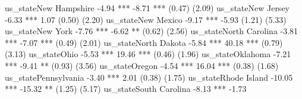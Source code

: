 us_stateNew Hampshire                                          -4.94 ***     -8.71 ***                              
                                                               (0.47)        (2.09)                                 
us_stateNew Jersey                                             -6.33 ***      1.07                                  
                                                               (0.50)        (2.20)                                 
us_stateNew Mexico                                             -9.17 ***     -5.93                                  
                                                               (1.21)        (5.33)                                 
us_stateNew York                                               -7.76 ***     -6.62 **                               
                                                               (0.62)        (2.56)                                 
us_stateNorth Carolina                                         -3.81 ***     -7.07 ***                              
                                                               (0.49)        (2.01)                                 
us_stateNorth Dakota                                           -5.84 ***     40.18 ***                              
                                                               (0.79)        (3.13)                                 
us_stateOhio                                                   -5.53 ***     19.46 ***                              
                                                               (0.46)        (1.96)                                 
us_stateOklahoma                                               -7.21 ***     -9.41 **                               
                                                               (0.93)        (3.56)                                 
us_stateOregon                                                 -4.54 ***     16.04 ***                              
                                                               (0.38)        (1.68)                                 
us_statePennsylvania                                           -3.40 ***      2.01                                  
                                                               (0.38)        (1.75)                                 
us_stateRhode Island                                          -10.05 ***    -15.32 **                               
                                                               (1.25)        (5.17)                                 
us_stateSouth Carolina                                         -8.13 ***     -1.73                                  
